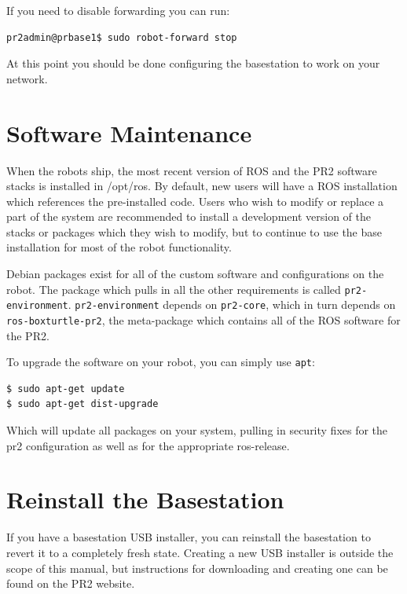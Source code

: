 If you need to disable forwarding you can run:

\begin{verbatim}
pr2admin@prbase1$ sudo robot-forward stop
\end{verbatim}

At this point you should be done configuring the basestation to work
on your network.

\section{Software Maintenance}

When the robots ship, the most recent version of ROS and the PR2
software stacks is installed in /opt/ros.  By default, new users will
have a ROS installation which references the pre-installed code.
Users who wish to modify or replace a part of the system are
recommended to install a development version of the stacks or packages
which they wish to modify, but to continue to use the base
installation for most of the robot functionality.

Debian packages exist for all of the custom software and
configurations on the robot.  The package which pulls in all the other
requirements is called \texttt{pr2-environment}.
\texttt{pr2-environment} depends on \texttt{pr2-core}, which in turn
depends on \texttt{ros-boxturtle-pr2}, the meta-package which contains
all of the ROS software for the PR2.

To upgrade the software on your robot, you can simply use \texttt{apt}:

\begin{verbatim}
$ sudo apt-get update
$ sudo apt-get dist-upgrade
\end{verbatim}

Which will update all packages on your system, pulling in security fixes for
the pr2 configuration as well as for the appropriate ros-release.

\section{Reinstall the Basestation}
If you have a basestation USB installer, you can reinstall the
basestation to revert it to a completely fresh state.  Creating a new
USB installer is outside the scope of this manual, but instructions
for downloading and creating one can be found on the PR2 website.

